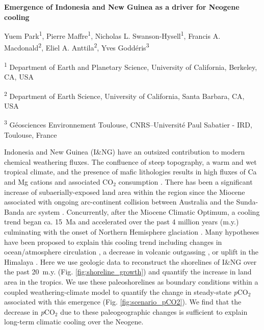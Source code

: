 \documentclass[11pt,letterpaper]{article}
\newcommand{\pCOtwo}{\textit{p}CO$_{2}$\xspace}
\newcommand{\COtwo}{CO$_{2}$\xspace}
\begin{document}
\begin{flushleft}
{\Large \textbf{Emergence of Indonesia and New Guinea as a driver for Neogene cooling}}

Yuem Park\textsuperscript{1},
Pierre Maffre\textsuperscript{1},
Nicholas L. Swanson-Hysell\textsuperscript{1},
Francis A. Macdonald\textsuperscript{2},
Eliel A. Anttila\textsuperscript{2},
Yves Godd\'eris\textsuperscript{3}

\bigskip
\textsuperscript{1} Department of Earth and Planetary Science, University of California, Berkeley, CA, USA

\textsuperscript{2} Department of Earth Science, University of California, Santa Barbara, CA, USA

\textsuperscript{3} G\'eosciences Environnement Toulouse, CNRS--Universit\'e Paul Sabatier - IRD, Toulouse, France

\bigskip

\end{flushleft}

\linenumbers

Indonesia and New Guinea (I\&NG) have an outsized contribution to modern chemical weathering fluxes. The confluence of steep topography, a warm and wet tropical climate, and the presence of mafic lithologies results in high fluxes of Ca and Mg cations and associated \COtwo consumption \cite{Gaillardet1999a, Hartmann2009a, Milliman2013a, Hartmann2014a}. There has been a significant increase of subaerially-exposed land area within the region since the Miocene associated with ongoing arc-continent collision between Australia and the Sunda-Banda arc system \cite{Molnar2015a, Hall2017a, Macdonald2019a}. Concurrently, after the Miocene Climatic Optimum, a cooling trend began ca. 15~Ma and accelerated over the past 4 million years (m.y.) culminating with the onset of Northern Hemisphere glaciation \cite{Shackleton1984a, Zachos2001a}. Many hypotheses have been proposed to explain this cooling trend including changes in ocean/atmosphere circulation \cite{Haug1998a, Shevenell2004a, Molnar2015a}, a decrease in volcanic outgassing \cite{Berner1983a}, or uplift in the Himalaya \cite{Raymo1988a}. Here we use geologic data to reconstruct the shorelines of I\&NG over the past 20~m.y. (Fig. \ref{fig:shoreline_growth}) and quantify the increase in land area in the tropics. We use these paleoshorelines as boundary conditions within a coupled weathering-climate model to quantify the change in steady-state \pCOtwo associated with this emergence (Fig. \ref{fig:scenario_pCO2}). We find that the decrease in \pCOtwo due to these paleogeographic changes is sufficient to explain long-term climatic cooling over the Neogene.
\end{document}
